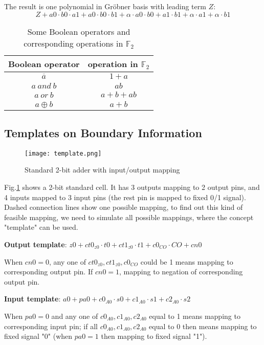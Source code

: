 \documentclass[conference,10pt]{IEEEtran}
\begin{document}
The result is one polynomial in Gr\"obner basis with leading term $Z$:
$$Z+a0\cdot b0\cdot a1+a0\cdot b0\cdot b1+\alpha\cdot a0\cdot b0+a1\cdot b1+\alpha\cdot a1+\alpha\cdot b1$$

\begin{table}
\centering
\begin{tabular}{|c|c|} \hline
Boolean operator & operation in $\mathbb{F}_{2}$\\ \hline
$\overline{a}$ & $1 + a$\\ \hline
$a\ and\ b$ & $ab$\\ \hline
$a\ or\ b$ & $a + b + ab$\\ \hline
$a \oplus b$ & $a + b$\\
\hline\end{tabular}
\caption{Some Boolean operators and corresponding operations in $\mathbb{F}_{2}$}
\label{table:booltogalois_op}
\end{table}

\subsection{Templates on Boundary Information}
\begin{figure}[hbt]
	\begin{center}
	\texttt{[image: template.png]}
	\end{center}
	\caption{Standard 2-bit adder with input/output mapping}
	\label{fig:template}
\end{figure}

Fig.\ref{fig:template} shows a 2-bit standard cell. It has 3 outputs mapping to 2 output pins,
and 4 inputs mapped to 3 input pins (the rest pin is mapped to fixed 0/1 signal). Dashed connection
lines show one possible mapping, to find out this kind of feasible mapping, we need to simulate
all possible mappings, where the concept "template" can be used.\vspace{5mm}

{\bf Output template}: $z0+ct0_{z0}\cdot t0+ct1_{z0}\cdot t1+c0_{CO}\cdot CO+cn0$

When $cn0 = 0$, any one of $ct0_{z0},ct1_{z0},c0_{CO}$ could be 1 means mapping to corresponding output
pin. If $cn0 = 1$, mapping to negation of corresponding output pin.

{\bf Input template}: $a0+pa0+c0_{A0}\cdot s0+c1_{A0}\cdot s1+c2_{A0}\cdot s2$

When $pa0 = 0$ and any one of $c0_{A0},c1_{A0},c2_{A0}$ equal to 1 means mapping to corresponding input
pin; if all $c0_{A0},c1_{A0},c2_{A0}$ equal to 0 then means mapping to fixed signal "0" (when $pa0 = 1$ then
mapping to fixed signal "1").
\end{document}
